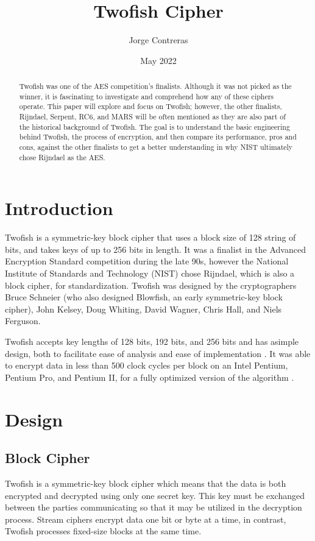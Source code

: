\documentclass[11pt]{article}
\title{Twofish Cipher}
\author{Jorge Contreras}
\date{May 2022}
\begin{document}
\maketitle


\begin{abstract}
Twofish was one of the AES competition's finalists. Although it was not picked as the winner, it is fascinating to investigate and comprehend how any of these ciphers operate. This paper will explore and focus on Twofish; however, the other finalists, Rijndael, Serpent, RC6, and MARS will be often mentioned as they are also part of the historical background of Twofish. The goal is to understand the basic engineering behind Twofish, the process of encryption, and then compare its performance, pros and cons, against the other finalists to get a better understanding in why NIST ultimately chose Rijndael as the AES.
\end{abstract}



\section{Introduction}
Twofish is a symmetric-key block cipher that uses a block size of 128 string of bits, and takes keys of up to 256 bits in length. It was a finalist in the Advanced Encryption Standard competition during the late 90s, however the National Institute of Standards and Technology (NIST) chose Rijndael, which is also a block cipher, for standardization. Twofish was designed by the cryptographers Bruce Schneier (who also designed Blowfish, an early  symmetric-key block cipher), John Kelsey, Doug Whiting, David Wagner, Chris Hall, and Niels Ferguson.

Twofish accepts key lengths of 128 bits, 192 bits, and 256 bits and has asimple design, both to facilitate ease of analysis and ease of implementation \cite{schneier1999twofish}. It was able to encrypt data in less than 500 clock cycles per block on an Intel Pentium, Pentium Pro, and Pentium II, for a fully optimized version of the algorithm \cite{schneier1999twofish}.

\section{Design}

\subsection{Block Cipher}
Twofish is a symmetric-key block cipher which means that the data is both encrypted and decrypted using only one secret key. This key must be exchanged between the parties communicating so that it may be utilized in the decryption process. Stream ciphers encrypt data one bit or byte at a time, in contrast, Twofish processes fixed-size blocks at the same time.
\end{document}
